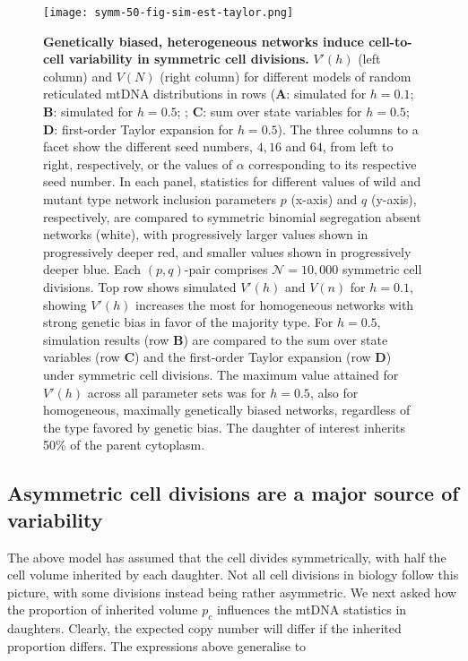 \documentclass{article}
\begin{document}
\begin{figure}
\centering
\texttt{[image: symm-50-fig-sim-est-taylor.png]}
\caption{\textbf{Genetically biased, heterogeneous networks induce cell-to-cell variability in symmetric cell divisions.} $V'(h)$ (left column) and $V(N)$ (right column) for different models of random reticulated mtDNA distributions in rows (\textbf{A}: simulated for $h=0.1$; \textbf{B}: simulated for $h=0.5$; ; \textbf{C}: sum over state variables for $h=0.5$; \textbf{D}: first-order Taylor expansion for $h=0.5$). The three columns to a facet show the different seed numbers, $4, 16$ and $64$, from left to right, respectively, or the values of $\alpha$ corresponding to its respective seed number. In each panel, statistics for different values of wild and mutant type network inclusion parameters $p$ (x-axis) and $q$ (y-axis), respectively, are compared to symmetric binomial segregation absent networks (white), with progressively larger values shown in progressively deeper red, and smaller values shown in progressively deeper blue. Each $(p,q)$-pair comprises $\mathcal{N}=10,000$ symmetric cell divisions. Top row shows simulated $V'(h)$ and $V(n)$ for $h=0.1$, showing $V'(h)$ increases the most for homogeneous networks with strong genetic bias in favor of the majority type. For $h=0.5$, simulation results (row \textbf{B}) are compared to the sum over state variables (row \textbf{C}) and the first-order Taylor expansion (row \textbf{D}) under symmetric cell divisions. The maximum value attained for $V'(h)$ across all parameter sets was for $h=0.5$, also for homogeneous, maximally genetically biased networks, regardless of the type favored by genetic bias. The daughter of interest inherits 50\% of the parent cytoplasm.}\label{fig:sim-model-compare}
\end{figure}

\subsection{Asymmetric cell divisions are a major source of variability}
The above model has assumed that the cell divides symmetrically, with half the cell volume inherited by each daughter. Not all cell divisions in biology follow this picture, with some divisions instead being rather asymmetric. We next asked how the proportion of inherited volume $p_c$ influences the mtDNA statistics in daughters. Clearly, the expected copy number will differ if the inherited proportion differs. The expressions above generalise to
\end{document}
